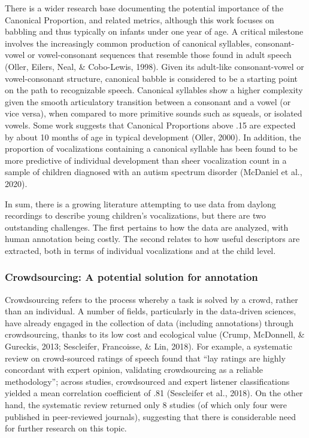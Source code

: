\documentclass[english,,man]{apa6}
\begin{document}
There is a wider research base documenting the potential importance of the Canonical Proportion, and related metrics, although this work focuses on babbling and thus typically on infants under one year of age. A critical milestone involves the increasingly common production of canonical syllables, consonant-vowel or vowel-consonant sequences that resemble those found in adult speech (Oller, Eilers, Neal, \& Cobo-Lewis, 1998). Given its adult-like consonant-vowel or vowel-consonant structure, canonical babble is considered to be a starting point on the path to recognizable speech. Canonical syllables show a higher complexity given the smooth articulatory transition between a consonant and a vowel (or vice versa), when compared to more primitive sounds such as squeals, or isolated vowels. Some work suggests that Canonical Proportions above .15 are expected by about 10 months of age in typical development (Oller, 2000). In addition, the proportion of vocalizations containing a canonical syllable has been found to be more predictive of individual development than sheer vocalization count in a sample of children diagnosed with an autism spectrum disorder (McDaniel et al., 2020).

In sum, there is a growing literature attempting to use data from daylong recordings to describe young children's vocalizations, but there are two outstanding challenges. The first pertains to how the data are analyzed, with human annotation being costly. The second relates to how useful descriptors are extracted, both in terms of individual vocalizations and at the child level.

\hypertarget{crowdsourcing-a-potential-solution-for-annotation}{%
\subsubsection{Crowdsourcing: A potential solution for annotation}\label{crowdsourcing-a-potential-solution-for-annotation}}

Crowdsourcing refers to the process whereby a task is solved by a crowd, rather than an individual. A number of fields, particularly in the data-driven sciences, have already engaged in the collection of data (including annotations) through crowdsourcing, thanks to its low cost and ecological value (Crump, McDonnell, \& Gureckis, 2013; Sescleifer, Francoisse, \& Lin, 2018). For example, a systematic review on crowd-sourced ratings of speech found that \enquote{lay ratings are highly concordant with expert opinion, validating crowdsourcing as a reliable methodology}; across studies, crowdsourced and expert listener classifications yielded a mean correlation coefficient of .81 (Sescleifer et al., 2018). On the other hand, the systematic review returned only 8 studies (of which only four were published in peer-reviewed journals), suggesting that there is considerable need for further research on this topic.
\end{document}
